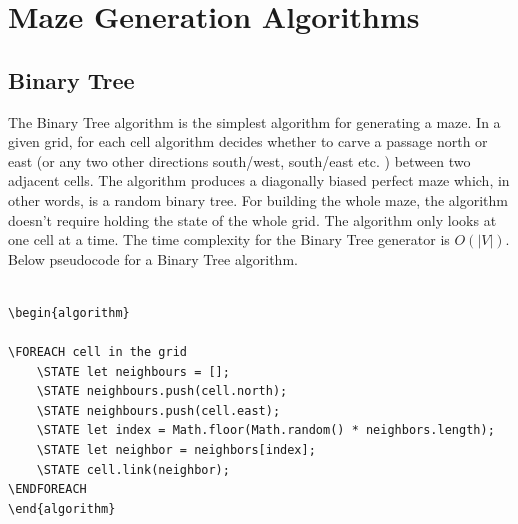 \section{Maze Generation Algorithms}
\subsection{Binary Tree}

The Binary Tree algorithm is the simplest algorithm for generating a maze. In a given grid, for each cell algorithm decides whether to carve a passage north or east (or any two other directions south/west, south/east etc. ) between two adjacent cells. The algorithm produces a diagonally biased perfect maze which, in other words, is a random binary tree. For building the whole maze, the algorithm doesn’t require holding the state of the whole grid. The algorithm only looks at one cell at a time. The time complexity for the Binary Tree generator is $O(|V|)$. Below pseudocode for a Binary Tree algorithm.

\begin{lstlisting}[caption={Pseudocode for a Binary Tree Algorithm}]

\begin{algorithm}

\FOREACH cell in the grid
	\STATE let neighbours = [];
	\STATE neighbours.push(cell.north);
	\STATE neighbours.push(cell.east);
	\STATE let index = Math.floor(Math.random() * neighbors.length);
	\STATE let neighbor = neighbors[index];
	\STATE cell.link(neighbor);
\ENDFOREACH	
\end{algorithm}
\end{lstlisting}

